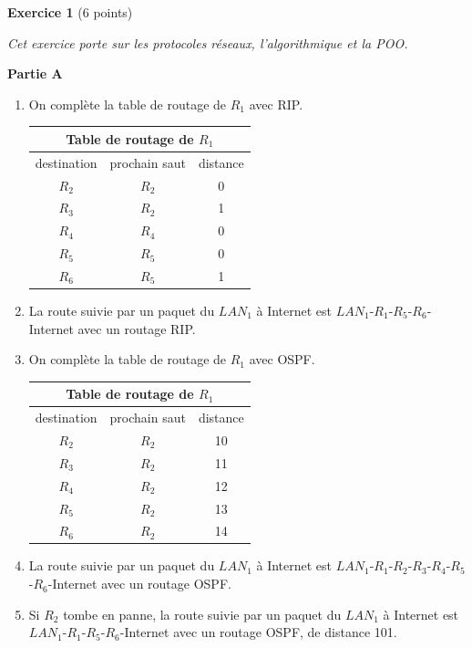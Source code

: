 \documentclass[11pt,a4paper]{article}
\begin{document}


\bigskip

\textbf{Exercice 1} (6 points)

\medskip

\textit{Cet exercice porte sur les protocoles réseaux, l’algorithmique et la POO.}


\textbf{Partie A}

\begin{enumerate}
\item On complète la table de routage de $R_1$ avec RIP.

\begin{center}
\begin{tabular}{|c|c|c|}
\hline
\multicolumn{3}{|c|}{Table de routage de $R_1$}\\
\hline
destination&prochain saut&distance\\
\hline
$R_2$&$R_2$&0\\
\hline
$R_3$&$R_2$&1\\
\hline
$R_4$&$R_4$&0\\
\hline
$R_5$&$R_5$&0\\
\hline
$R_6$&$R_5$&1\\
\hline
\end{tabular}
\end{center}

\item La route suivie par un paquet du $LAN_1$ à Internet est $LAN_1$-$R_1$-$R_5$-$R_6$-Internet avec un routage RIP.

\item On complète la table de routage de $R_1$ avec OSPF.

\begin{center}
\begin{tabular}{|c|c|c|}
\hline
\multicolumn{3}{|c|}{Table de routage de $R_1$}\\
\hline
destination&prochain saut&distance\\
\hline
$R_2$&$R_2$&10\\
\hline
$R_3$&$R_2$&11\\
\hline
$R_4$&$R_2$&12\\
\hline
$R_5$&$R_2$&13\\
\hline
$R_6$&$R_2$&14\\
\hline
\end{tabular}
\end{center}


\item La route suivie par un paquet du $LAN_1$ à Internet est $LAN_1$-$R_1$-$R_2$-$R_3$-$R_4$-$R_5$-$R_6$-Internet avec un routage OSPF.


\item Si $R_2$ tombe en panne, la route suivie par un paquet du $LAN_1$ à Internet est $LAN_1$-$R_1$-$R_5$-$R_6$-Internet avec un routage OSPF, de distance 101.
\end{enumerate}
\end{document}
